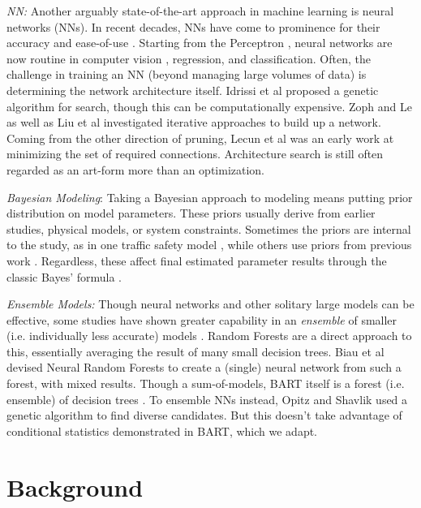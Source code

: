 \documentclass[12pt]{article}
\begin{document}
\emph{NN:} Another arguably state-of-the-art approach in machine learning is neural networks (NNs).  In recent decades, NNs have come to prominence for their accuracy and ease-of-use \cite{schmidhuber2015deep}.  Starting from the Perceptron \cite{rosenblatt1958perceptron}, neural networks are now routine in computer vision \cite{tan2019efficientnet}, regression, and classification.  Often, the challenge in training an NN (beyond managing large volumes of data) is determining the network architecture itself.  Idrissi et al \cite{idrissi2016genetic} proposed a genetic algorithm for search, though this can be computationally expensive.  Zoph and Le \cite{zoph2016neural} as well as Liu et al \cite{liu2018progressive} investigated iterative approaches to build up a network.  Coming from the other direction of pruning, Lecun et al \cite{lecun1989optimal} was an early work at minimizing the set of required connections.  Architecture search is still often regarded as an art-form more than an optimization.

\emph{Bayesian Modeling}: Taking a Bayesian approach to modeling means putting prior distribution on model parameters.  These priors usually derive from earlier studies, physical models, or system constraints.  Sometimes the priors are internal to the study, as in one traffic safety model \cite{schneider2009bayesian}, while others use priors from previous work \cite{roman2022bayclump}.  Regardless, these affect final estimated parameter results through the classic Bayes' formula \cite{johnson2022bayes}.

\emph{Ensemble Models:} Though neural networks and other solitary large models can be effective, some studies have shown greater capability in an \emph{ensemble} of smaller (i.e. individually less accurate) models \cite{hastie2009elements}.  Random Forests \cite{breiman1996bagging} are a direct approach to this, essentially averaging the result of many small decision trees.  Biau et al \cite{biau2019neural} devised Neural Random Forests to create a (single) neural network from such a forest, with mixed results.  Though a sum-of-models, BART itself is a forest (i.e. ensemble) of decision trees \cite{chipman2010bart}.  To ensemble NNs instead, Opitz and Shavlik \cite{opitz1996actively} used a genetic algorithm to find diverse candidates.  But this doesn't take advantage of conditional statistics demonstrated in BART, which we adapt.

\section{Background}\label{sec:background}
\end{document}
